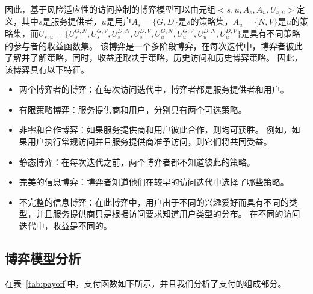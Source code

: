 因此，基于风险适应性的访问控制的博弈模型可以由元组$<s,u,A_s,A_u,U_{s,u}>$定义，其中$s$是服务提供者，$u$是用户$A_s=\{G,D\}$是$s$的策略集，$A_u=\{N,V\}$是$u$的策略集，而$U_{s,u}=\{U_s^{G,N}, U_s^{G,V}, U_s^{D,N}, U_s^{D,V}, U_u^{G,N}, U_u^{G,V}, U_u^{D,N}, U_u^{D,V}\}$是具有不同策略的参与者的收益函数集。 该博弈是一个多阶段博弈，在每次迭代中，博弈者彼此了解并了解策略，同时，收益还取决于策略，历史访问和历史博弈策略。 因此，该博弈具有以下特征。
\begin{itemize}
	\item 两个博弈者的博弈：在每次访问迭代中，博弈者都是服务提供者和用户。
	\item 有限策略博弈：服务提供商和用户，分别具有两个可选策略。
	\item 非零和合作博弈：如果服务提供商和用户彼此合作，则均可获胜。 例如，如果用户执行常规访问并且服务提供商准予访问，则它们将共同受益。
	\item 静态博弈：在每次迭代之前，两个博弈者都不知道彼此的策略。
	\item 完美的信息博弈：博弈者知道他们在较早的访问迭代中选择了哪些策略。
	\item 不完整的信息博弈：在此博弈中，用户出于不同的兴趣爱好而具有不同的类型，并且服务提供商只是根据访问要求知道用户类型的分布。 在不同的访问迭代中，收益是不同的。
\end{itemize}

\subsection{博弈模型分析}

在表~\ref{tab:payoff}中，支付函数如下所示，并且我们分析了支付的组成部分。

